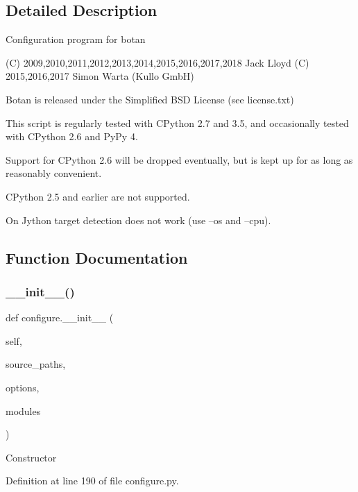 \subsection{Detailed Description}
\begin{DoxyVerb}Configuration program for botan

(C) 2009,2010,2011,2012,2013,2014,2015,2016,2017,2018 Jack Lloyd
(C) 2015,2016,2017 Simon Warta (Kullo GmbH)

Botan is released under the Simplified BSD License (see license.txt)

This script is regularly tested with CPython 2.7 and 3.5, and
occasionally tested with CPython 2.6 and PyPy 4.

Support for CPython 2.6 will be dropped eventually, but is kept up for as
long as reasonably convenient.

CPython 2.5 and earlier are not supported.

On Jython target detection does not work (use --os and --cpu).
\end{DoxyVerb}
 

\subsection{Function Documentation}
\mbox{\label{namespaceconfigure_a572a526cccb7574a72a8b283811706a1}} 
\subsubsection{\texorpdfstring{\+\_\+\+\_\+init\+\_\+\+\_\+()}{\_\_init\_\_()}}
{\footnotesize\ttfamily def configure.\+\_\+\+\_\+init\+\_\+\+\_\+ (\begin{DoxyParamCaption}\item[{}]{self,  }\item[{}]{source\+\_\+paths,  }\item[{}]{options,  }\item[{}]{modules }\end{DoxyParamCaption})}

\begin{DoxyVerb}Constructor
\end{DoxyVerb}
 

Definition at line 190 of file configure.\+py.

